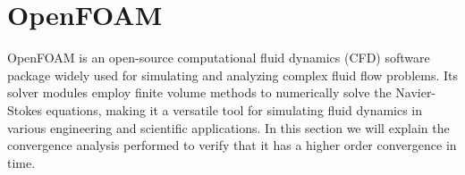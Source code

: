 \documentclass[
  english,        %
  font=times,     %
  onecolumn,      %
]{tumarticle}
\begin{document}









\section{OpenFOAM}

OpenFOAM is an open-source computational fluid dynamics (CFD) software package widely used for simulating and analyzing complex fluid flow problems. Its solver modules employ finite volume methods to numerically solve the Navier-Stokes equations, making it a versatile tool for simulating fluid dynamics in various engineering and scientific applications. In this section we will explain the convergence analysis performed to verify that it has a higher order convergence in time.   
\end{document}
